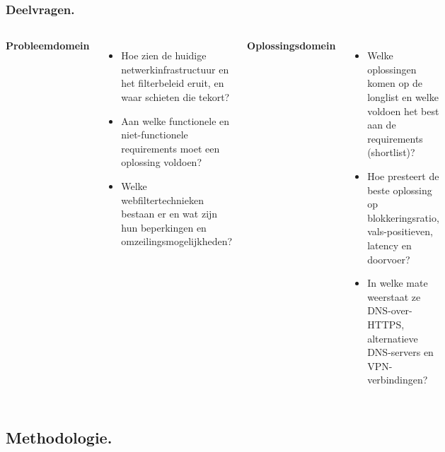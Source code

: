 \documentclass[aspectratio=169]{beamer}
\begin{document}
\begin{frame}
    \frametitle{Deelvragen.}

    \begin{columns}[t]
        \textbf{Probleemdomein}
        \begin{itemize}
            \item Hoe zien de huidige netwerkinfrastructuur en het
                  filterbeleid eruit, en waar schieten die tekort?
            \item Aan welke functionele en niet-functionele requirements
                  moet een oplossing voldoen?
            \item Welke webfiltertechnieken bestaan er en wat zijn hun
                  beperkingen en omzeilingsmogelijkheden?
        \end{itemize}

        \textbf{Oplossingsdomein}
        \begin{itemize}
            \item Welke oplossingen komen op de longlist en welke voldoen
                  het best aan de requirements (shortlist)?
            \item Hoe presteert de beste oplossing op blokkeringsratio,
                  vals-positieven, latency en doorvoer?
            \item In welke mate weerstaat ze DNS-over-HTTPS, alternatieve
                  DNS-servers en VPN-verbindingen?
        \end{itemize}
    \end{columns}
\end{frame}

\subsection{Methodologie.}
\end{document}
